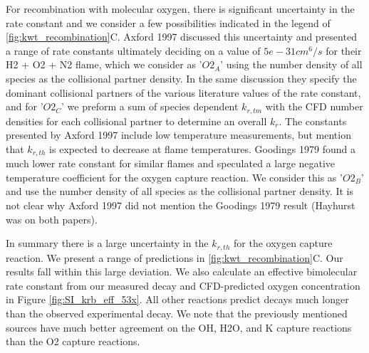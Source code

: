 For recombination with molecular oxygen, there is significant uncertainty in the rate constant and we consider a few possibilities indicated in the legend of \ref{fig:kwt_recombination}C. Axford 1997 discussed this uncertainty and presented a range of rate constants ultimately deciding on a value of $5e-31 cm^6/s$ for their H2 + O2 + N2 flame, which we consider as '$O2_A$' using the number density of all species as the collisional partner density. In the same discussion they specify the dominant collisional partners of the various literature values of the rate constant, and for '$O2_C$' we preform a sum of species dependent $k_{r,tm}$ with the CFD number densities for each collisional partner to determine an overall $k_r$. The constants presented by Axford 1997 include low temperature measurements, but mention that $k_{r,th}$ is expected to decrease at flame temperatures. Goodings 1979 found a much lower rate constant for similar flames and speculated a large negative temperature coefficient for the oxygen capture reaction. We consider this as '$O2_B$' and use the number density of all species as the collisional partner density. It is not clear why Axford 1997 did not mention the Goodings 1979 result (Hayhurst was on both papers). 

In summary there is a large uncertainty in the $k_{r,th}$ for the oxygen capture reaction. We present a range of predictions in \ref{fig:kwt_recombination}C. Our results fall within this large deviation. We also calculate an effective bimolecular rate constant from our measured decay and CFD-predicted oxygen concentration in Figure \ref*{fig:SI_krb_eff_53x}. All other reactions predict decays much longer than the observed experimental decay. We note that the previously mentioned sources have much better agreement on the OH, H2O, and K capture reactions than the O2 capture reactions. 





